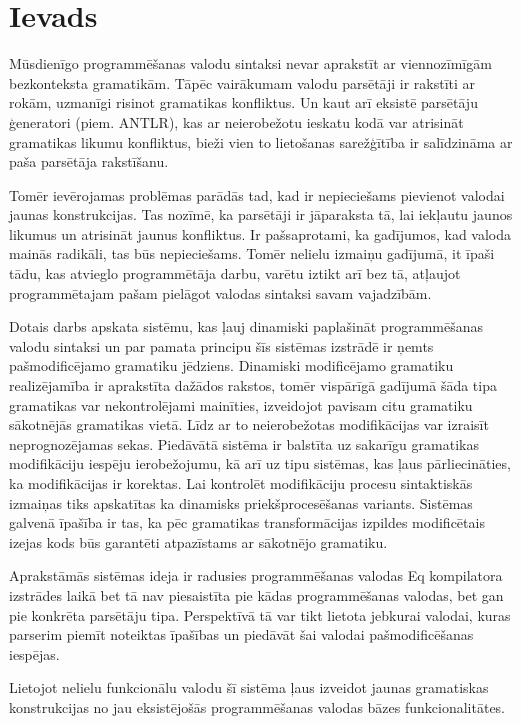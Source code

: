 \section{Ievads}
Mūsdienīgo programmēšanas valodu sintaksi nevar aprakstīt ar viennozīmīgām bezkonteksta gramatikām. Tāpēc vairākumam valodu parsētāji ir rakstīti ar rokām, uzmanīgi risinot gramatikas konfliktus. Un kaut arī eksistē parsētāju ģeneratori (piem. ANTLR), kas ar neierobežotu ieskatu kodā var atrisināt gramatikas likumu konfliktus, bieži vien to lietošanas sarežģītība ir salīdzināma ar paša parsētāja rakstīšanu.

Tomēr ievērojamas problēmas parādās tad, kad ir nepieciešams pievienot valodai jaunas konstrukcijas. Tas nozīmē, ka parsētāji ir jāparaksta tā, lai iekļautu jaunos likumus un atrisināt jaunus konfliktus. Ir pašsaprotami, ka gadījumos, kad valoda mainās radikāli, tas būs nepieciešams. Tomēr nelielu izmaiņu gadījumā, it īpaši tādu, kas atvieglo programmētāja darbu, varētu iztikt arī bez tā, atļaujot programmētajam pašam pielāgot valodas sintaksi savam vajadzībām.

Dotais darbs apskata sistēmu, kas ļauj dinamiski paplašināt programmēšanas valodu sintaksi un par pamata principu šīs sistēmas izstrādē ir ņemts pašmodificējamo gramatiku jēdziens. Dinamiski modificējamo gramatiku realizējamība ir aprakstīta dažādos rakstos, tomēr vispārīgā gadījumā šāda tipa gramatikas var nekontrolējami mainīties, izveidojot pavisam citu gramatiku sākotnējās gramatikas vietā. Līdz ar to neierobežotas modifikācijas var izraisīt neprognozējamas sekas.
Piedāvātā sistēma ir balstīta uz sakarīgu gramatikas modifikāciju iespēju ierobežojumu, kā arī uz tipu sistēmas, kas ļaus pārliecināties, ka modifikācijas ir korektas. Lai kontrolēt modifikāciju procesu sintaktiskās izmaiņas tiks apskatītas ka dinamisks priekšprocesēšanas variants. Sistēmas galvenā īpašība ir tas, ka pēc gramatikas transformācijas izpildes modificētais izejas kods būs garantēti atpazīstams ar sākotnējo gramatiku.

Aprakstāmās sistēmas ideja ir radusies programmēšanas valodas Eq kompilatora izstrādes laikā bet tā nav piesaistīta pie kādas programmēšanas valodas, bet gan pie konkrēta parsētāju tipa. Perspektīvā tā var tikt lietota jebkurai valodai, kuras parserim piemīt noteiktas īpašības un piedāvāt šai valodai pašmodificēšanas iespējas.

Lietojot nelielu funkcionālu valodu šī sistēma ļaus izveidot jaunas gramatiskas konstrukcijas no jau eksistējošās programmēšanas valodas bāzes funkcionalitātes.

